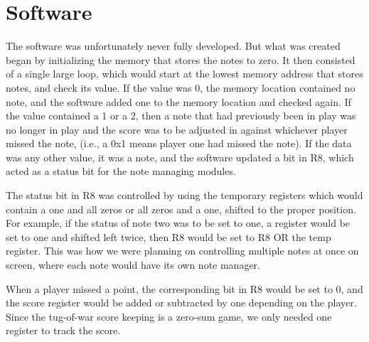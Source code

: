 \documentclass[onecolumn, 12pt]{IEEEtran}
\begin{document}
\section{Software}
The software was unfortunately never fully developed.  But what was created began by initializing the memory that stores the notes to zero.  It then consisted of a single large loop, which would start at the lowest memory address that stores notes, and check its value.  If the value was 0, the memory location contained no note, and the software added one to the memory location and checked again.  If the value contained a 1 or a 2, then a note that had previously been in play was no longer in play and the score was to be adjusted in against  whichever player missed the note, (i.e., a 0x1 means player one had missed the note).  If the data was any other value, it was a note, and the software updated a bit in R8, which acted as a status bit for the note managing modules.
\par
The status bit in R8 was controlled by using the temporary registers which would contain a one and all zeros or all zeros and a one, shifted to the proper position.  For example, if the status of note two was to be set to one, a register would be set to one and shifted left twice, then R8 would be set to R8 OR the temp register.  This was how we were planning on controlling multiple notes at once on screen, where each note would have its own note manager.
\par
When a player missed a point, the corresponding bit in R8 would be set to 0, and the score register would be added or subtracted by one depending on the player.  Since the tug-of-war score keeping is a zero-sum game, we only needed one register to track the score.
\end{document}
